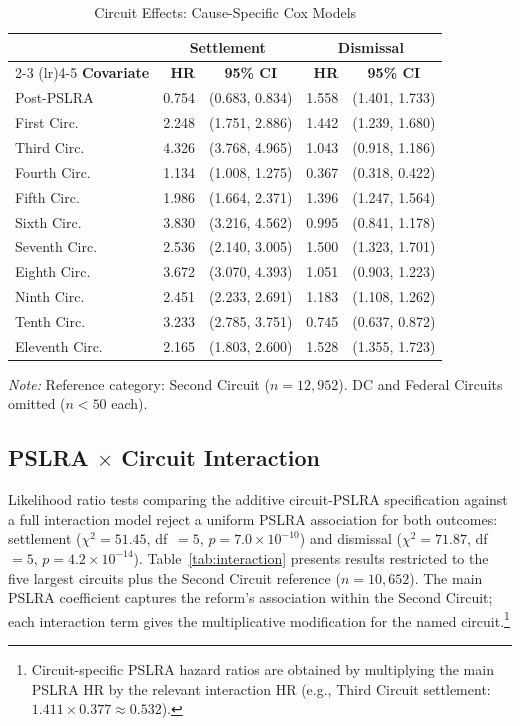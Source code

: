 \begin{table}[htbp]
\centering
\caption[Circuit Effects: Cause-Specific Cox Models]{Circuit Effects:
Cause-Specific Cox Models}
\label{tab:cox_circuit}
\renewcommand{\arraystretch}{1.2}
\begin{tabular*}{\textwidth}{@{\extracolsep{\fill}} l r c r c @{}}
\toprule
& \multicolumn{2}{c}{\textbf{Settlement}} & \multicolumn{2}{c}{\textbf{Dismissal}} \\
\cmidrule(lr){2-3} \cmidrule(lr){4-5}
\textbf{Covariate} & \textbf{HR} & \textbf{95\% CI} & \textbf{HR} & \textbf{95\% CI} \\
\midrule
Post-PSLRA    & 0.754 & (0.683, 0.834) & 1.558 & (1.401, 1.733) \\
First Circ.   & 2.248 & (1.751, 2.886) & 1.442 & (1.239, 1.680) \\
Third Circ.   & 4.326 & (3.768, 4.965) & 1.043 & (0.918, 1.186) \\
Fourth Circ.  & 1.134 & (1.008, 1.275) & 0.367 & (0.318, 0.422) \\
Fifth Circ.   & 1.986 & (1.664, 2.371) & 1.396 & (1.247, 1.564) \\
Sixth Circ.   & 3.830 & (3.216, 4.562) & 0.995 & (0.841, 1.178) \\
Seventh Circ. & 2.536 & (2.140, 3.005) & 1.500 & (1.323, 1.701) \\
Eighth Circ.  & 3.672 & (3.070, 4.393) & 1.051 & (0.903, 1.223) \\
Ninth Circ.   & 2.451 & (2.233, 2.691) & 1.183 & (1.108, 1.262) \\
Tenth Circ.   & 3.233 & (2.785, 3.751) & 0.745 & (0.637, 0.872) \\
Eleventh Circ.& 2.165 & (1.803, 2.600) & 1.528 & (1.355, 1.723) \\
\bottomrule
\end{tabular*}
\begin{minipage}{\textwidth}
\vskip 4pt
\footnotesize \textit{Note:} Reference category: Second Circuit
($n = 12{,}952$). DC and Federal Circuits omitted ($n < 50$ each).
\end{minipage}
\end{table}

\subsection{PSLRA \texorpdfstring{$\times$}{x} Circuit Interaction}

Likelihood ratio tests comparing the additive circuit-PSLRA specification
against a full interaction model reject a uniform PSLRA association for
both outcomes: settlement ($\chi^2 = 51.45$, df~$= 5$,
$p = 7.0 \times 10^{-10}$) and dismissal ($\chi^2 = 71.87$, df~$= 5$,
$p = 4.2 \times 10^{-14}$). Table~\ref{tab:interaction} presents results
restricted to the five largest circuits plus the Second Circuit reference
($n = 10{,}652$). The main PSLRA coefficient captures the reform's
association within the Second Circuit; each interaction term gives the
multiplicative modification for the named circuit.\footnote{Circuit-specific
PSLRA hazard ratios are obtained by multiplying the main PSLRA HR by the
relevant interaction HR (e.g., Third Circuit settlement:
$1.411 \times 0.377 \approx 0.532$).}

